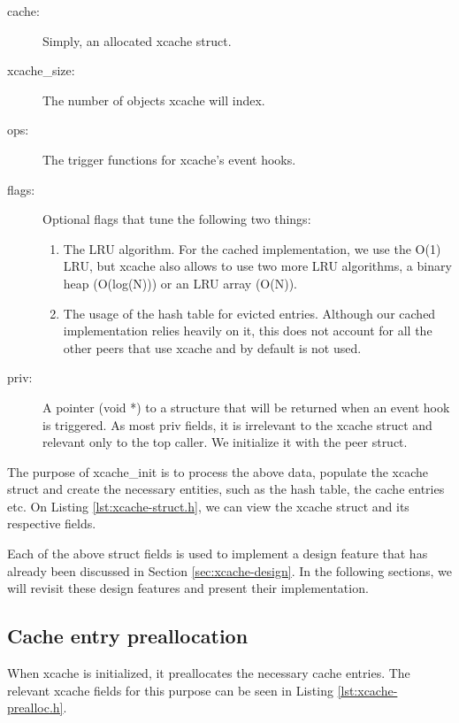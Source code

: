 \begin{description}
	\item[cache:] Simply, an allocated xcache struct.
	\item[xcache\_size:] The number of objects xcache will index.
	\item[ops:] The trigger functions for xcache's event hooks.
	\item[flags:] Optional flags that tune the following two things:
		\begin{enumerate}
			\item The LRU algorithm. For the cached implementation, 
				we use the O(1) LRU, but xcache also allows to 
				use two more LRU algorithms, a binary heap 
				(O(log(N))) or an LRU array (O(N)).
			\item The usage of the hash table for evicted entries.  
				Although our cached implementation relies 
				heavily on it, this does not account for all 
				the other peers that use xcache and by default 
				is not used.
		\end{enumerate}
	\item[priv:] A pointer (void *) to a structure that will be returned 
		when an event hook is triggered. As most priv fields, it is 
		irrelevant to the xcache struct and relevant only to the top 
		caller. We initialize it with the peer struct.
\end{description}

The purpose of xcache\_init is to process the above data, populate the xcache 
struct and create the necessary entities, such as the hash table, the cache 
entries etc. On Listing \ref{lst:xcache-struct.h}, we can view the xcache 
struct and its respective fields.


Each of the above \xcache struct fields is used to implement a design feature 
that has already been discussed in Section \ref{sec:xcache-design}. In the 
following sections, we will revisit these design features and present their 
implementation.

\subsection{Cache entry preallocation}

When xcache is initialized, it preallocates the necessary cache entries. The 
relevant xcache fields for this purpose can be seen in Listing 
\ref{lst:xcache-prealloc.h}.

